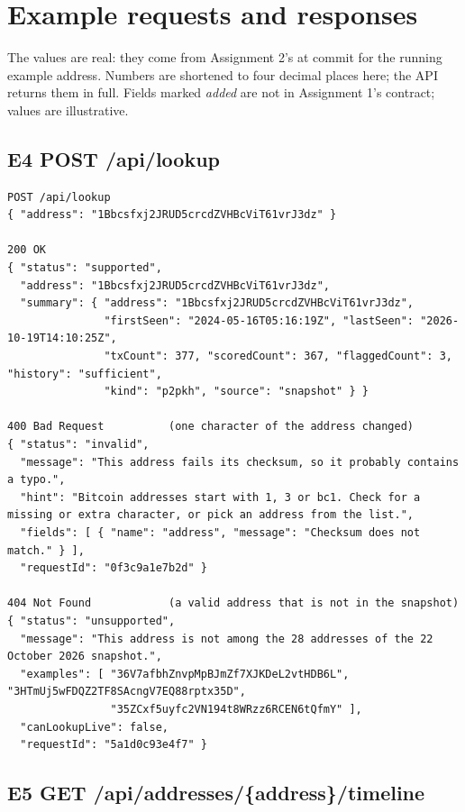 \section{Example requests and responses}
\label{app:json}

The values are real: they come from Assignment 2's  at commit  for the
running example address. Numbers are shortened to four decimal places here; the API returns them in
full. Fields marked \emph{added} are not in Assignment 1's contract;  values are
illustrative.

\subsection{E4 \quad POST /api/lookup}

\begin{lstlisting}[style=json]
POST /api/lookup
{ "address": "1Bbcsfxj2JRUD5crcdZVHBcViT61vrJ3dz" }

200 OK
{ "status": "supported",
  "address": "1Bbcsfxj2JRUD5crcdZVHBcViT61vrJ3dz",
  "summary": { "address": "1Bbcsfxj2JRUD5crcdZVHBcViT61vrJ3dz",
               "firstSeen": "2024-05-16T05:16:19Z", "lastSeen": "2026-10-19T14:10:25Z",
               "txCount": 377, "scoredCount": 367, "flaggedCount": 3, "history": "sufficient",
               "kind": "p2pkh", "source": "snapshot" } }

400 Bad Request          (one character of the address changed)
{ "status": "invalid",
  "message": "This address fails its checksum, so it probably contains a typo.",
  "hint": "Bitcoin addresses start with 1, 3 or bc1. Check for a missing or extra character, or pick an address from the list.",
  "fields": [ { "name": "address", "message": "Checksum does not match." } ],
  "requestId": "0f3c9a1e7b2d" }

404 Not Found            (a valid address that is not in the snapshot)
{ "status": "unsupported",
  "message": "This address is not among the 28 addresses of the 22 October 2026 snapshot.",
  "examples": [ "36V7afbhZnvpMpBJmZf7XJKDeL2vtHDB6L", "3HTmUj5wFDQZ2TF8SAcngV7EQ88rptx35D",
                "35ZCxf5uyfc2VN194t8WRzz6RCEN6tQfmY" ],
  "canLookupLive": false,
  "requestId": "5a1d0c93e4f7" }
\end{lstlisting}

\subsection{E5 \quad GET /api/addresses/\{address\}/timeline}

